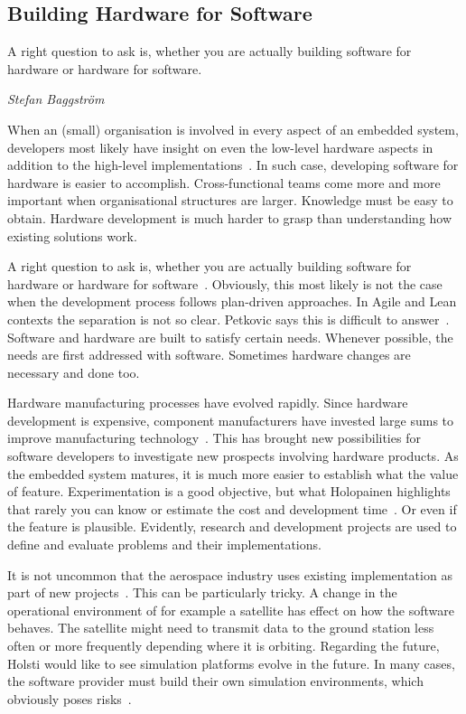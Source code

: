 \documentclass[english]{tktltiki2}
\begin{document}
\subsection{Building Hardware for Software}

\epigraph{A right question to ask is, whether you are actually building software for hardware or hardware for software.}{\textit{Stefan Baggström~\cite{BT15}}}

When an (small) organisation is involved in every aspect of an embedded system, developers most likely have insight on even the low-level hardware aspects in addition to the high-level implementations~\cite{Kri15}. In such case, developing software for hardware is easier to accomplish. Cross-functional teams come more and more important when organisational structures are larger. Knowledge must be easy to obtain. Hardware development is much harder to grasp than understanding how existing solutions work.

A right question to ask is, whether you are actually building software for hardware or hardware for software~\cite{BT15}. Obviously, this most likely is not the case when the development process follows plan-driven approaches. In Agile and Lean contexts the separation is not so clear. Petkovic says this is difficult to answer~\cite{Pet15}. Software and hardware are built to satisfy certain needs. Whenever possible, the needs are first addressed with software. Sometimes hardware changes are necessary and done too.

Hardware manufacturing processes have evolved rapidly. Since hardware development is expensive, component manufacturers have invested large sums to improve manufacturing technology~\cite{Hol15a}. This has brought new possibilities for software developers to investigate new prospects involving hardware products. As the embedded system matures, it is much more easier to establish what the value of feature. Experimentation is a good objective, but what Holopainen highlights that rarely you can know or estimate the cost and development time~\cite{Hol15a}. Or even if the feature is plausible. Evidently, research and development projects are used to define and evaluate problems and their implementations.

It is not uncommon that the aerospace industry uses existing implementation as part of new projects~\cite{Hol15b}. This can be particularly tricky. A change in the operational environment of for example a satellite has effect on how the software behaves. The satellite might need to transmit data to the ground station less often or more frequently depending where it is orbiting. Regarding the future, Holsti would like to see simulation platforms evolve in the future. In many cases, the software provider must build their own simulation environments, which obviously poses risks~\cite{Hol15b}.
\end{document}
